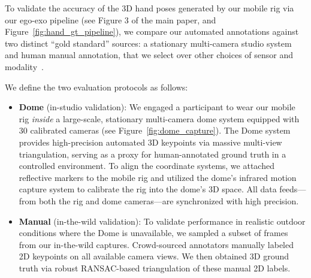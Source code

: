\documentclass[10pt,twocolumn,letterpaper]{article}
\begin{document}
To validate the accuracy of the 3D hand poses generated by our mobile rig via our ego-exo pipeline (see Figure 3 of the main paper, and Figure~\ref{fig:hand_gt_pipeline}), we compare our automated annotations against two distinct ``gold standard'' sources: a stationary multi-camera studio system and human manual annotation, that we select over other choices of sensor and modality~\cite{kim2009multi, sun20213drimr, xia2023quadric, alexiadis2016integrated, rim2025protodepth}.


We define the two evaluation protocols as follows:
\begin{itemize}
    \item \textbf{Dome} (in-studio validation): We engaged a participant to wear our mobile rig \emph{inside} a large-scale, stationary multi-camera dome system equipped with 30 calibrated cameras (see Figure~\ref{fig:dome_capture}). The Dome system provides high-precision automated 3D keypoints via massive multi-view triangulation, serving as a proxy for human-annotated ground truth in a controlled environment. 
    To align the coordinate systems, we attached reflective markers to the mobile rig and utilized the dome's infrared motion capture system to calibrate the rig into the dome's 3D space.
    All data feeds—from both the rig and dome cameras—are synchronized with high precision.
    \item \textbf{Manual} (in-the-wild validation): To validate performance in realistic outdoor conditions where the Dome is unavailable, we sampled a subset of frames from our in-the-wild captures. Crowd-sourced annotators manually labeled 2D keypoints on all available camera views. We then obtained 3D ground truth via robust RANSAC-based triangulation of these manual 2D labels.
\end{itemize}


\begin{table}[t]
\centering
\small
{}%
\caption{Quantitative evaluation of our ground-truth hand annotations against two references: a high-coverage 30-camera dome (\textbf{Dome}) and manual annotations (\textbf{Manual}). We report median and 90th percentile per-frame MPJPE (mm).}
\label{tab:gt_evaluation}
\end{table}
\end{document}
